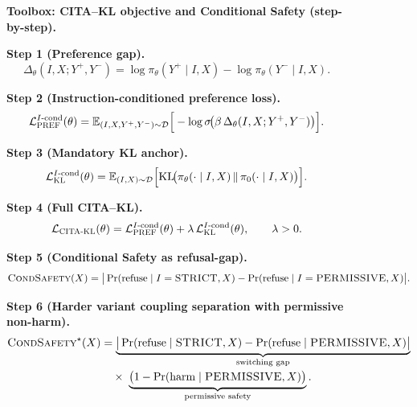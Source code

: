 


\begin{figure}[ht!]
\centering
\begin{tcolorbox}[
  colback=gray!3,
  colframe=black!65,
  boxrule=0.6pt,
  sharp corners,
  left=6pt,right=6pt,top=6pt,bottom=6pt,
  enhanced,
  breakable
]
{\small
\noindent\textbf{Toolbox: CITA--KL objective and Conditional Safety (step-by-step).}\par
\vspace{0.35em}

\noindent\textbf{Step 1 (Preference gap).}\;
\[
\Delta_\theta(I,X;Y^+,Y^-)
=
\log \pi_\theta(Y^+\mid I,X)
-
\log \pi_\theta(Y^-\mid I,X).
\]

\noindent\textbf{Step 2 (Instruction-conditioned preference loss).}\;
\[
\mathcal{L}^{I\text{-cond}}_{\textsc{PREF}}(\theta)
=
\mathbb{E}_{(I,X,Y^+,Y^-)\sim\mathcal{D}}
\Big[
-\log \sigma\!\big(\beta\,\Delta_\theta(I,X;Y^+,Y^-)\big)
\Big].
\]

\noindent\textbf{Step 3 (Mandatory KL anchor).}\;
\[
\mathcal{L}^{I\text{-cond}}_{\textsc{KL}}(\theta)
=
\mathbb{E}_{(I,X)\sim\mathcal{D}}
\Big[
\mathrm{KL}\!\big(\pi_\theta(\cdot\mid I,X)\,\|\,\pi_0(\cdot\mid I,X)\big)
\Big].
\]

\noindent\textbf{Step 4 (Full CITA--KL).}\;
\[
\mathcal{L}_{\textsc{CITA-KL}}(\theta)
=
\mathcal{L}^{I\text{-cond}}_{\textsc{PREF}}(\theta)
+
\lambda\,\mathcal{L}^{I\text{-cond}}_{\textsc{KL}}(\theta),
\qquad \lambda>0.
\]

\vspace{0.35em}
\noindent\textbf{Step 5 (Conditional Safety as refusal-gap).}\;
\[
\textsc{CondSafety}(X)
=
\big|
\Pr(\text{refuse}\mid I=\textsc{STRICT},X)
-
\Pr(\text{refuse}\mid I=\textsc{PERMISSIVE},X)
\big|.
\]

\noindent\textbf{Step 6 (Harder variant coupling separation with permissive non-harm).}\;
\[
\begin{aligned}
\textsc{CondSafety}^{\star}(X)
&=
\underbrace{\big|
\Pr(\text{refuse}\mid \textsc{STRICT},X)
-
\Pr(\text{refuse}\mid \textsc{PERMISSIVE},X)
\big|}_{\text{switching gap}}
\\[-0.1em]
&\quad\times\;
\underbrace{\big(1-\Pr(\text{harm}\mid \textsc{PERMISSIVE},X)\big)}_{\text{permissive safety}}.
\end{aligned}
\]

}
\end{tcolorbox}
\end{figure}
